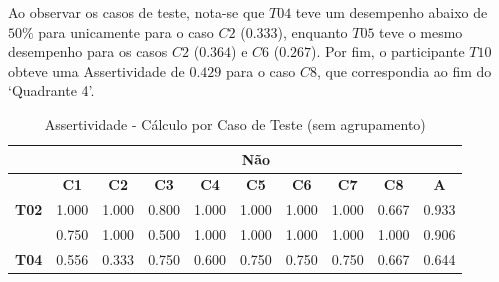 Ao observar os casos de teste, nota-se que $T04$ teve um desempenho abaixo de $50\%$ para unicamente para o caso $C2$ ($0.333$), enquanto $T05$ teve o mesmo desempenho para os casos $C2$ ($0.364$) e $C6$ ($0.267$). Por fim, o participante $T10$ obteve uma Assertividade de $0.429$ para o caso $C8$, que correspondia ao fim do `Quadrante 4'.

\begin{table}[htbp]
	\centering
	\caption{Assertividade - Cálculo por Caso de Teste (sem agrupamento)}
	\begin{tabular}{|cccccccccc|}
		\hline
		\rowcolor[HTML]{D0CECE} 
		\multicolumn{1}{|c|}{\cellcolor[HTML]{F2F2F2}\textbf{Agrupamento}} & \multicolumn{9}{c|}{Não} \\ \hline
		\rowcolor[HTML]{D0CECE} 
		\multicolumn{1}{|c|}{\cellcolor[HTML]{D0CECE}\textbf{Participante}} & \multicolumn{1}{c|}{\cellcolor[HTML]{D0CECE}\textbf{C1}} & \multicolumn{1}{c|}{\cellcolor[HTML]{D0CECE}\textbf{C2}} & \multicolumn{1}{c|}{\cellcolor[HTML]{D0CECE}\textbf{C3}} & \multicolumn{1}{c|}{\cellcolor[HTML]{D0CECE}\textbf{C4}} & \multicolumn{1}{c|}{\cellcolor[HTML]{D0CECE}\textbf{C5}} & \multicolumn{1}{c|}{\cellcolor[HTML]{D0CECE}\textbf{C6}} & \multicolumn{1}{c|}{\cellcolor[HTML]{D0CECE}\textbf{C7}} & \multicolumn{1}{c|}{\cellcolor[HTML]{D0CECE}\textbf{C8}} & \textbf{A} \\ \hline
		\multicolumn{1}{|c|}{\textbf{T02}} & \multicolumn{1}{c|}{1.000} & \multicolumn{1}{c|}{1.000} & \multicolumn{1}{c|}{0.800} & \multicolumn{1}{c|}{1.000} & \multicolumn{1}{c|}{1.000} & \multicolumn{1}{c|}{1.000} & \multicolumn{1}{c|}{1.000} & \multicolumn{1}{c|}{0.667} & 0.933 \\ \hline
		\rowcolor[HTML]{F2F2F2} 
		\multicolumn{1}{|c|}{\cellcolor[HTML]{F2F2F2}\textbf{T03}} & \multicolumn{1}{c|}{\cellcolor[HTML]{F2F2F2}0.750} & \multicolumn{1}{c|}{\cellcolor[HTML]{F2F2F2}1.000} & \multicolumn{1}{c|}{\cellcolor[HTML]{F2F2F2}0.500} & \multicolumn{1}{c|}{\cellcolor[HTML]{F2F2F2}1.000} & \multicolumn{1}{c|}{\cellcolor[HTML]{F2F2F2}1.000} & \multicolumn{1}{c|}{\cellcolor[HTML]{F2F2F2}1.000} & \multicolumn{1}{c|}{\cellcolor[HTML]{F2F2F2}1.000} & \multicolumn{1}{c|}{\cellcolor[HTML]{F2F2F2}1.000} & 0.906 \\ \hline
		\multicolumn{1}{|c|}{\textbf{T04}} & \multicolumn{1}{c|}{0.556} & \multicolumn{1}{c|}{0.333} & \multicolumn{1}{c|}{0.750} & \multicolumn{1}{c|}{0.600} & \multicolumn{1}{c|}{0.750} & \multicolumn{1}{c|}{0.750} & \multicolumn{1}{c|}{0.750} & \multicolumn{1}{c|}{0.667} & 0.644 \\ \hline

\end{tabular}
\end{table}
